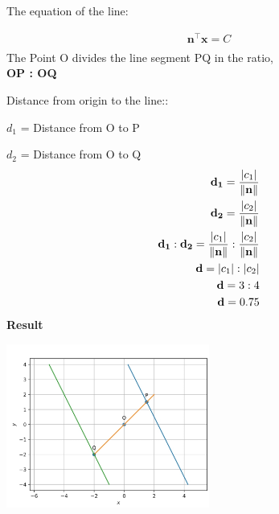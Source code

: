 \documentclass[10pt,a4paper]{report}
\let\vec\mathbf
\begin{document}
The equation of the line:
\raggedright \large 
\begin{gather*}
\vec{n}^{\top}\vec{x} = C \\
\end{gather*} 
The Point O divides the line segment PQ in the ratio,\\
\textbf{OP : OQ}\vspace{2mm}\\
\raggedright {Distance from origin to the line:}:\vspace{2mm}\\
\raggedright {$d_1$ = Distance from O to P} \\
\raggedright {$d_2$ = Distance from O to Q}
\begin{align}
\vec{d_1} =  \frac{|c_1|}{\vec{\|n\|}} \\ 
\vec{d_2} =  \frac{|c_2|}{\vec{\|n\|}}
\vspace{2mm}
\\
\vec{d_1}:\vec{d_2} = \frac{|c_1|}{\vec{\|n\|}}:\frac{|c_2|}{\vec{\|n\|}}
\\
\vec{d}=|c_1| : |c_2|
\\
\vec{d} = 3 : 4
\\
\vec{d} = 0.75
\end{align}
\textbf{Result} 
\begin{center}
\includegraphics[width=0.5\textwidth]{line.jpg}  
\end{center}
\vspace{5mm}
 \vspace{2mm} 
\end{document}
